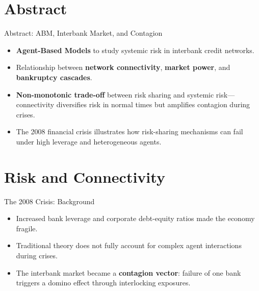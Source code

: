 \section{Abstract}\label{sec:1}

\begin{frame}{Abstract: ABM, Interbank Market, and Contagion}
  \begin{itemize}
    \item \textbf{Agent-Based Models} to study systemic risk in interbank credit networks.
    \item Relationship between \textbf{network connectivity}, \textbf{market power}, and \textbf{bankruptcy cascades}.    
    \item \textbf{Non-monotonic trade-off} between risk sharing and systemic risk---connectivity diversifies risk in normal times but amplifies contagion during crises.
    \item The 2008 financial crisis illustrates how risk-sharing mechanisms can fail under high leverage and heterogeneous agents.
  \end{itemize}
\end{frame}

\section{Risk and Connectivity}\label{sec:2}

\begin{frame}{The 2008 Crisis: Background}
  \begin{itemize}
    \item Increased bank leverage and corporate debt-equity ratios made the economy fragile.
    \item Traditional theory does not fully account for complex agent interactions during crises.
    \item The interbank market became a \textbf{contagion vector}: failure of one bank triggers a domino effect through interlocking exposures.
  \end{itemize}
\end{frame}

